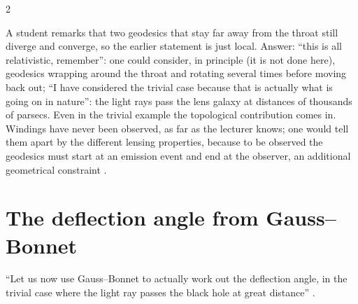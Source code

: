 \begin{paracol}{2}
\begin{coursenote}
\end{coursenote}
\begin{coursenote}
A student remarks that two geodesics that stay far away from the throat still diverge and converge, so the earlier statement is just local. Answer: ``this is all relativistic, remember'': one could consider, in principle (it is not done here), geodesics wrapping around the throat and rotating several times before moving back out; ``I have considered the trivial case because that is actually what is going on in nature'': the light rays pass the lens galaxy at distances of thousands of parsecs. Even in the trivial example the topological contribution comes in. Windings have never been observed, as far as the lecturer knows; one would tell them apart by the different lensing properties, because to be observed the geodesics must start at an emission event and end at the observer, an additional geometrical constraint .
\end{coursenote}

\section{The deflection angle from Gauss--Bonnet}\label{sec:c17-deflection}

``Let us now use Gauss--Bonnet to actually work out the deflection angle, in the trivial case where the light ray passes the black hole at great distance'' .


\end{paracol}
